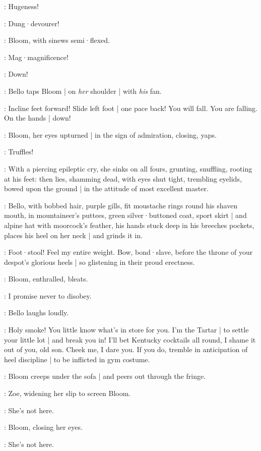 \Bloom:
Hugeness!

\Bello:
Dung·devourer!

:
Bloom,
with sinews semi·flexed.

\Bloom:
Mag·magnificence!

\Bello:
Down!

:
Bello taps Bloom |
on \emph{her} shoulder |
with \emph{his} fan.

\Bello:
Incline feet forward!
Slide left foot |
one pace back!
You will fall.
You are falling.
On the hands |
down!

:
Bloom,
her eyes upturned |
in the sign of admiration,
closing,
yaps.

\Bloom:
Truffles!

:
With a piercing epileptic cry,
she sinks on all fours,
grunting,
snuffling,
rooting at his feet:
then lies,
shamming dead,
with eyes shut tight,
trembling eyelids,
bowed upon the ground |
in the attitude of most excellent master.

:
Bello,
with bobbed hair,
purple gills,
fit moustache rings round his shaven mouth,
in mountaineer's puttees,
green silver·buttoned coat,
sport skirt |
and alpine hat with moorcock's feather,
his hands stuck deep in his breeches pockets,
places his heel on her neck |
and grinds it in.

\Bello:
Foot·stool!
Feel my entire weight.
Bow,
bond·slave,
before the throne of your despot's glorious heels |
so glistening in their proud erectness.

:
Bloom,
enthralled,
bleats.

\Bloom:
I promise never to disobey.

:
Bello laughs loudly.

\Bello:
Holy smoke!
You little know what's in store for you.
I'm the Tartar |
to settle your little lot  |
and break you in!
I'll bet Kentucky cocktails all round,
I shame it out of you,
old son.
Cheek me,
I dare you.
If you do,
tremble in anticipation of heel discipline |
to be inflicted in gym costume.%

:
Bloom creeps under the sofa |
and peers out through the fringe.

:
Zoe,
widening her slip to screen Bloom.

\Zoe:
She's not here.

:
Bloom,
closing her eyes.

\Bloom:
She's not here.

